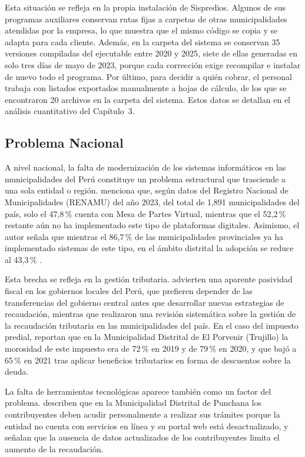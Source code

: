 \documentclass[12pt,a4paper]{report}
\begin{document}
Esta situación se refleja en la propia instalación de Sispredios. Algunos de sus programas auxiliares conservan rutas fijas a carpetas de otras municipalidades atendidas por la empresa, lo que muestra que el mismo código se copia y se adapta para cada cliente. Además, en la carpeta del sistema se conservan 35 versiones compiladas del ejecutable entre 2020 y 2025, siete de ellas generadas en solo tres días de mayo de 2023, porque cada corrección exige recompilar e instalar de nuevo todo el programa. Por último, para decidir a quién cobrar, el personal trabaja con listados exportados manualmente a hojas de cálculo, de los que se encontraron 20 archivos en la carpeta del sistema. Estos datos se detallan en el análisis cuantitativo del Capítulo~3.

\subsection{Problema Nacional}

A nivel nacional, la falta de modernización de los sistemas informáticos en las municipalidades del Perú constituye un problema estructural que trasciende a una sola entidad o región. \textcite{francoulco2026} menciona que, según datos del Registro Nacional de Municipalidades (RENAMU) del año 2023, del total de 1,891 municipalidades del país, solo el 47,8\,\% cuenta con Mesa de Partes Virtual, mientras que el 52,2\,\% restante aún no ha implementado este tipo de plataformas digitales. Asimismo, el autor señala que mientras el 86,7\,\% de las municipalidades provinciales ya ha implementado sistemas de este tipo, en el ámbito distrital la adopción se reduce al 43,3\,\% \parencite{francoulco2026}.

Esta brecha se refleja en la gestión tributaria. \textcite{romerocarazas2021} advierten una aparente pasividad fiscal en los gobiernos locales del Perú, que prefieren depender de las transferencias del gobierno central antes que desarrollar nuevas estrategias de recaudación, mientras que \textcite{rojasbarbaran2021} realizaron una revisión sistemática sobre la gestión de la recaudación tributaria en las municipalidades del país. En el caso del impuesto predial, \textcite{riosvelasquez2022} reportan que en la Municipalidad Distrital de El Porvenir (Trujillo) la morosidad de este impuesto era de 72\,\% en 2019 y de 79\,\% en 2020, y que bajó a 65\,\% en 2021 tras aplicar beneficios tributarios en forma de descuentos sobre la deuda.

La falta de herramientas tecnológicas aparece también como un factor del problema. \textcite{soriadiaz2022} describen que en la Municipalidad Distrital de Punchana los contribuyentes deben acudir personalmente a realizar sus trámites porque la entidad no cuenta con servicios en línea y su portal web está desactualizado, y señalan que la ausencia de datos actualizados de los contribuyentes limita el aumento de la recaudación.
\end{document}
